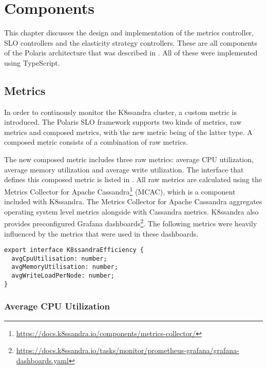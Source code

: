 \chapter{Components}
\label{ch:components}

This chapter discusses the design and implementation of the metrics controller, SLO controllers and the elasticity strategy controllers. These are all components of the Polaris architecture that was described in . All of these were implemented using TypeScript.

\section{Metrics}
\label{sec:metrics}

In order to continously monitor the K8ssandra cluster, a custom metric is introduced. The Polaris SLO framework supports two kinds of metrics, raw metrics and composed metrics, with the new metric being of the latter type. A composed metric consists of a combination of raw metrics.

The new composed metric includes three raw metrics: average CPU utilization, average memory utilization and average write utilization. The interface that defines this composed metric is listed in . All raw metrics are calculated using the Metrics Collector for Apache Cassandra\footnote{\url{https://docs.k8ssandra.io/components/metrics-collector/}} (MCAC), which is a component included with K8ssandra. The Metrics Collector for Apache Cassandra aggregates operating system level metrics alongside with Cassandra metrics. K8ssandra also provides preconfigured Grafana dashboards\footnote{\raggedright\url{https://docs.k8ssandra.io/tasks/monitor/prometheus-grafana/grafana-dashboards.yaml}}. The following metrics were heavily influenced by the metrics that were used in these dashboards.

\begin{lstlisting}[caption={K8ssandraEfficiency composed metric},
                    captionpos=b,
                    label=lst:K8ssandraEfficiency,
                    float]
export interface K8ssandraEfficiency {
  avgCpuUtilisation: number;
  avgMemoryUtilisation: number;
  avgWriteLoadPerNode: number;
}
\end{lstlisting}

\subsection{Average CPU Utilization}

